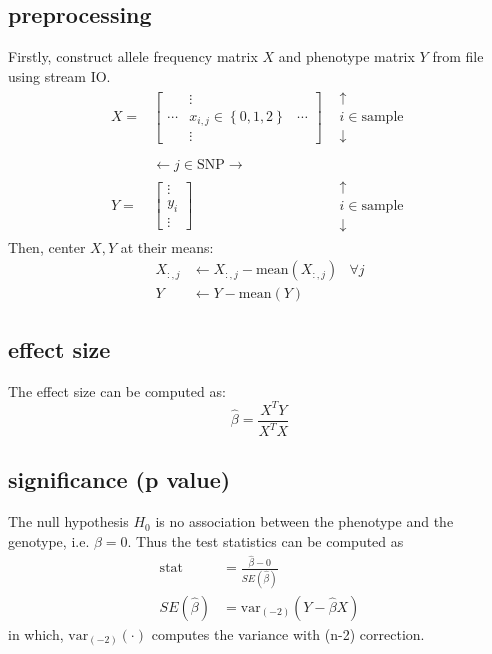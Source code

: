 \documentclass{article}
\begin{document}
\subsection{preprocessing}
Firstly, construct allele frequency matrix $X$ and phenotype matrix $Y$ from file using stream IO.
$$
\begin{matrix}X=&\left[ \begin{matrix}&\vdots &\\ \cdots &x_{i,j}\in \left\{ 0,1,2\right\}  &\cdots \\ &\vdots &\end{matrix} \right]  &\begin{gathered}\uparrow \\ i\in \text{sample} \\ \downarrow \end{gathered} \\ &&\\ &\leftarrow j\in \text{SNP} \rightarrow &\\ Y=&\left[ \begin{gathered}\vdots \\ y_{i}\\ \vdots \end{gathered} \right]  &\begin{gathered}\uparrow \\ i\in \text{sample} \\ \downarrow \end{gathered} \end{matrix}
$$
Then, center $X, Y$ at their means:
$$
\begin{aligned}
X_{:,j}&\leftarrow X_{:,j}-\text{mean} \left( X_{:,j}\right) & \forall j \\ 
Y&\leftarrow Y-\text{mean} \left( Y\right)  
\end{aligned} 
$$

\subsection{effect size}
The effect size can be computed as:
$$
\hat{\beta} =\frac{X^{T}Y}{X^{T}X} 
$$

\subsection{significance (p value)}
The null hypothesis $H_0$ is no association between the phenotype and the genotype,
i.e. $\beta = 0$.
Thus the test statistics can be computed as
$$
\begin{aligned}
\text{stat} &=\frac{\hat{\beta } -0}{SE\left( \hat{\beta } \right)  } \\ 
SE\left( \hat{\beta } \right)  &=\text{var}_{(-2)} (Y-\hat{\beta} X)
\end{aligned}
$$
in which, $\text{var}_{(-2)}(\cdot)$ computes the variance with (n-2) correction.
\end{document}
